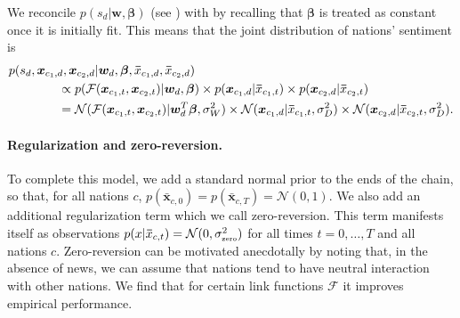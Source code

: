 We reconcile $p(s_d | \bm w, \bm \beta)$ (see )
with  by recalling that $\bm \beta$ is treated as
constant once it is initially fit.  This means that the joint distribution
of nations' sentiment is
\begin{align}
  p(s_d, \bm x_{c_1,d}, \bm x_{c_2,d} | \bm w_d, \bm \beta, \bm \bar
  x_{c_1, d}, \bm \bar x_{c_2, d}) & \nonumber \\
  & \hspace{-110pt} \propto
  p( \mathcal{F}(\bm x_{c_1,t}, \bm x_{c_2,t}) | \bm w_d, \bm \beta)
  \times p(\bm x_{c_1,d} | \bm \bar x_{c_1, t} )
  \times p(\bm x_{c_2,d} | \bm \bar x_{c_2, t} ) \nonumber \\
  & \hspace{-110pt} =
  \mathcal{N}( \mathcal{F}(\bm x_{c_1,t}, \bm x_{c_2,t}) |
  \bm w_d^T \bm \beta, \sigma_W^2 )
  \times \mathcal{N}(\bm x_{c_1,d} | \bm \bar x_{c_1, t}, \sigma_D^2)
  \times \mathcal{N}(\bm x_{c_2,d} | \bm \bar x_{c_2, t}, \sigma_D^2).
\end{align}

\paragraph{Regularization and zero-reversion.} To complete this model,
we add a standard normal prior to the ends of the chain, so that, for
all nations $c$, $p(\bm \bar x_{c, 0}) = p(\bm \bar x_{c,T}) =
\mathcal{N}(0, 1)$.  We also add an additional regularization term
which we call zero-reversion.  This term manifests itself as
observations $p(x | \bm \bar x_{c, t}) = \mathcal{N}(0,
\sigma_{\mbox{\tiny zero}}^2)$ for all times $t = 0, \ldots, T$ and
all nations $c$.  Zero-reversion can be motivated anecdotally by
noting that, in the absence of news, we can assume that nations tend
to have neutral interaction with other nations.  We find that for
certain link functions $\mathcal{F}$ it improves empirical
performance.



